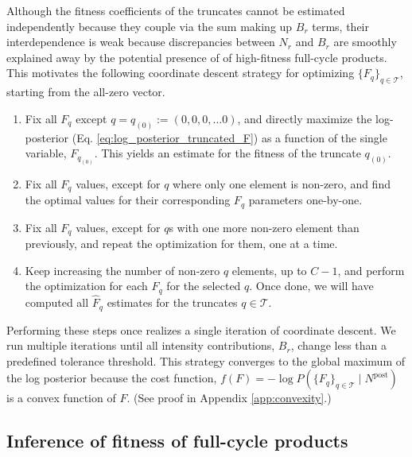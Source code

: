 \documentclass[letter,10pt,oneside]{article}
\newcommand{\+}{^\dagger}
\newcommand{\refeq}[1]{Eq. \ref{#1}}
\begin{document}
Although the fitness coefficients of the truncates cannot be estimated independently because they couple via the sum making up $B_r$ terms, their interdependence is weak because discrepancies between $N_r$ and $B_r$ are smoothly explained away by the potential presence of of high-fitness full-cycle products. This motivates the following coordinate descent strategy for optimizing $\{F_q\}_{q\in\mathcal{T}}$, starting from the all-zero vector.
\begin{enumerate}
  \item Fix all $F_q$ except $q = q_{(0)} := (0,0,0,\ldots 0)$, and directly maximize the log-posterior (\refeq{eq:log_posterior_truncated_F}) as a function of the single variable, $F_{q_{(0)}}$. This yields an estimate for the fitness of the truncate $q_{(0)}$.
  \item Fix all $F_q$ values, except for $q$ where only one element is non-zero, and find the optimal values for their corresponding $F_q$ parameters one-by-one.
  \item Fix all $F_q$ values, except for $q$s with one more non-zero element than previously, and repeat the optimization for them, one at a time.
  \item Keep increasing the number of non-zero $q$ elements, up to $C-1$, and perform the optimization for each $F_q$ for the selected $q$. Once done, we will have computed all $\hat F_q$ estimates for the truncates $q \in \mathcal{T}$.
\end{enumerate}
Performing these steps once realizes a single iteration of coordinate descent. We run multiple iterations until all intensity contributions, $B_r$, change less than a predefined tolerance threshold. This strategy converges to the global maximum of the log posterior because the cost function, $f(F) =  - \log P(\{F_q\}_{q \in \mathcal{T}}\;|\; N^\text{post})$ is a convex function of $F$. (See proof in Appendix \ref{app:convexity}.)


\subsection{Inference of fitness of full-cycle products}
\end{document}
